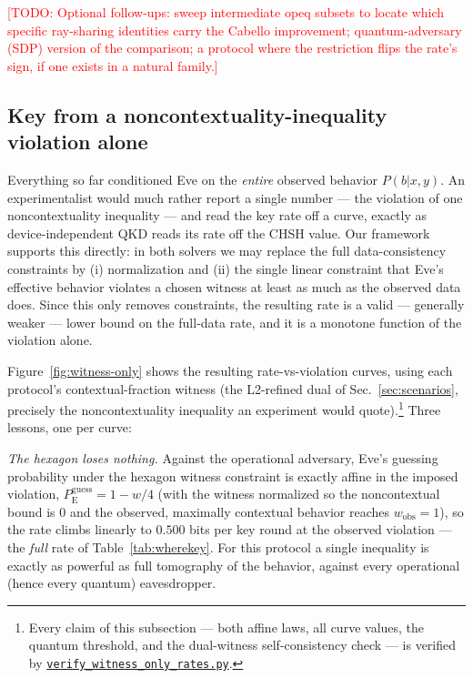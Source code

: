 \documentclass[aps,pra,twocolumn,superscriptaddress,longbibliography,nofootinbib]{revtex4-2}
\newcommand{\Eve}{\mathrm{E}}
\newcommand{\pguess}{P_{\Eve}^{\mathrm{guess}}}
\newcommand{\todo}[1]{\textcolor{red}{[TODO: #1]}}
\newcommand{\repoBase}{https://github.com/eliewolfe/RandomnessWinterSchool2026/blob/main/paper/scripts}
\newcommand{\repoScript}[1]{\href{\repoBase/#1}{\texttt{#1}}}
\begin{document}
\todo{Optional follow-ups: sweep intermediate opeq subsets to locate
which specific ray-sharing identities carry the Cabello improvement;
quantum-adversary (SDP) version of the comparison; a protocol where the
restriction flips the rate's sign, if one exists in a natural family.}

\subsection{Key from a noncontextuality-inequality violation alone}
\label{sec:results-witness}

Everything so far conditioned Eve on the \emph{entire} observed
behavior $P(b|x,y)$. An experimentalist would much rather report a
single number --- the violation of one noncontextuality inequality ---
and read the key rate off a curve, exactly as device-independent QKD
reads its rate off the CHSH value. Our framework supports this
directly: in both solvers we may replace the full data-consistency
constraints by (i) normalization and (ii) the single linear constraint
that Eve's effective behavior violates a chosen witness at least as
much as the observed data does. Since this only removes constraints,
the resulting rate is a valid --- generally weaker --- lower bound on
the full-data rate, and it is a monotone function of the violation
alone.

Figure~\ref{fig:witness-only} shows the resulting rate-vs-violation
curves, using each protocol's contextual-fraction witness (the
L2-refined dual of Sec.~\ref{sec:scenarios}, precisely the
noncontextuality inequality an experiment would quote).\footnote{Every
claim of this subsection --- both affine laws, all curve values, the
quantum threshold, and the dual-witness self-consistency check --- is
verified by \repoScript{verify\_witness\_only\_rates.py}.} Three
lessons, one per curve:

\emph{The hexagon loses nothing.} Against the operational adversary,
Eve's guessing probability under the hexagon witness constraint is
exactly affine in the imposed violation, $\pguess = 1-w/4$ (with the
witness normalized so the noncontextual bound is $0$ and the observed,
maximally contextual behavior reaches $w_{\mathrm{obs}}=1$), so the
rate climbs linearly to $0.500$ bits per key round at the observed
violation --- the \emph{full} rate of Table~\ref{tab:wherekey}. For
this protocol a single inequality is exactly as powerful as full
tomography of the behavior, against every operational (hence every
quantum) eavesdropper.
\end{document}

